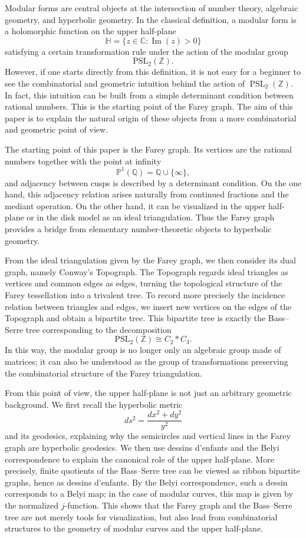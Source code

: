 \documentclass[10pt, a4paper]{article}
\theoremstyle{definition}
\theoremstyle{remark}
\begin{document}
Modular forms are central objects at the intersection of number theory, algebraic geometry, and hyperbolic geometry. In the classical definition, a modular form is a holomorphic function on the upper half-plane
\[
\mathbb H=\{z\in\mathbb C:\operatorname{Im}(z)>0\}
\]
satisfying a certain transformation rule under the action of the modular group
\[
\mathrm{PSL}_2(\mathbb Z).
\]
However, if one starts directly from this definition, it is not easy for a beginner to see the combinatorial and geometric intuition behind the action of \(\operatorname{PSL}_2(\mathbb Z)\). In fact, this intuition can be built from a simple determinant condition between rational numbers. This is the starting point of the Farey graph. The aim of this paper is to explain the natural origin of these objects from a more combinatorial and geometric point of view.

The starting point of this paper is the Farey graph. Its vertices are the rational numbers together with the point at infinity
\[
\mathbb P^1(\mathbb Q)=\mathbb Q\cup\{\infty\},
\]
and adjacency between cusps is described by a determinant condition. On the one hand, this adjacency relation arises naturally from continued fractions and the mediant operation. On the other hand, it can be visualized in the upper half-plane or in the disk model as an ideal triangulation. Thus the Farey graph provides a bridge from elementary number-theoretic objects to hyperbolic geometry.

From the ideal triangulation given by the Farey graph, we then consider its dual graph, namely Conway's Topograph. The Topograph regards ideal triangles as vertices and common edges as edges, turning the topological structure of the Farey tessellation into a trivalent tree. To record more precisely the incidence relation between triangles and edges, we insert new vertices on the edges of the Topograph and obtain a bipartite tree. This bipartite tree is exactly the Bass--Serre tree corresponding to the decomposition
\[
\mathrm{PSL}_2(\mathbb Z)
\cong C_2*C_3 .
\]
In this way, the modular group is no longer only an algebraic group made of matrices; it can also be understood as the group of transformations preserving the combinatorial structure of the Farey triangulation.

From this point of view, the upper half-plane is not just an arbitrary geometric background. We first recall the hyperbolic metric
\[
ds^2=\frac{dx^2+dy^2}{y^2}
\]
and its geodesics, explaining why the semicircles and vertical lines in the Farey graph are hyperbolic geodesics. We then use dessins d'enfants and the Belyi correspondence to explain the canonical role of the upper half-plane. More precisely, finite quotients of the Bass--Serre tree can be viewed as ribbon bipartite graphs, hence as dessins d'enfants. By the Belyi correspondence, such a dessin corresponds to a Belyi map; in the case of modular curves, this map is given by the normalized \(j\)-function. This shows that the Farey graph and the Bass--Serre tree are not merely tools for visualization, but also lead from combinatorial structures to the geometry of modular curves and the upper half-plane.
\end{document}
